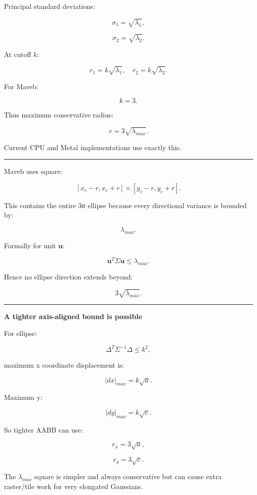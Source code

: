 Principal standard deviations:

\[
\sigma_1=
\sqrt{\lambda_1},
\]

\[
\sigma_2=
\sqrt{\lambda_2}.
\]

At cutoff \(k\):

\[
\boxed{
r_1=
k\sqrt{\lambda_1},
\quad
r_2=
k\sqrt{\lambda_2}.
}
\]

For Maveb:

\[
k=3.
\]

Thus maximum conservative radius:

\[
\boxed{
r=
3\sqrt{\lambda_{max}}.
}
\]

Current CPU and Metal implementations use exactly this.

\begin{center}\rule{0.5\linewidth}{0.5pt}\end{center}

Maveb uses square:

\[
[x_c-r,x_c+r]
\times
[y_c-r,y_c+r].
\]

This contains the entire 3σ ellipse because every directional variance is bounded by:

\[
\lambda_{max}.
\]

Formally for unit \(\mathbf u\):

\[
\mathbf u^T
\Sigma
\mathbf u
\le
\lambda_{max}.
\]

Hence no ellipse direction extends beyond:

\[
3\sqrt{\lambda_{max}}.
\]

\begin{center}\rule{0.5\linewidth}{0.5pt}\end{center}

\textbf{A tighter axis-aligned bound is possible}

For ellipse:

\[
\Delta^T
\Sigma^{-1}
\Delta
\le k^2,
\]

maximum x coordinate displacement is:

\[
\boxed{
|dx|_{max}
=
k\sqrt{a}.
}
\]

Maximum y:

\[
\boxed{
|dy|_{max}
=
k\sqrt{c}.
}
\]

So tighter AABB can use:

\[
r_x=3\sqrt a,
\]

\[
r_y=3\sqrt c.
\]

The \(\lambda_{max}\) square is simpler and always conservative but can cause extra raster/tile work for very elongated Gaussians.

